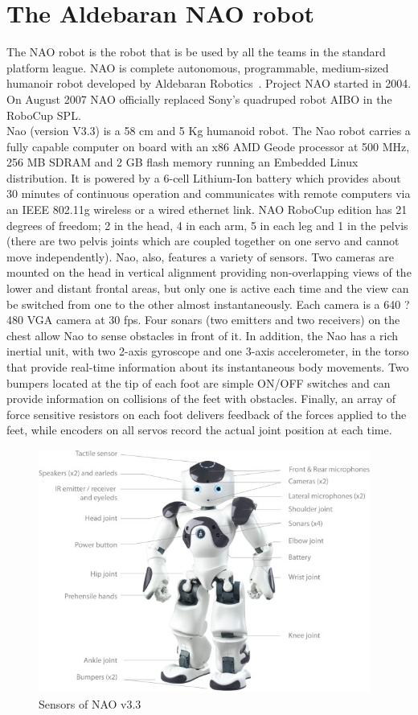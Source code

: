 \section{The Aldebaran NAO robot}
The NAO robot is the robot that is be used by all the teams in the standard platform league. NAO is complete autonomous, programmable, medium-sized humanoir robot developed by Aldebaran Robotics~\cite{naopaper}. Project NAO started in 2004. On August 2007 NAO officially replaced Sony's quadruped robot AIBO in the RoboCup SPL.\\
Nao (version V3.3) is a 58 cm and 5 Kg humanoid robot. The Nao robot carries a fully capable computer on board with an x86 AMD Geode processor at 500 MHz, 256 MB SDRAM and 2 GB flash memory running an Embedded Linux distribution. It is powered by a 6-cell Lithium-Ion battery which provides about 30 minutes of continuous operation and communicates with remote computers via an IEEE 802.11g wireless or a wired ethernet link. NAO RoboCup edition has 21 degrees of freedom; 2 in the head, 4 in each arm, 5 in each leg and 1 in the pelvis (there are two pelvis joints which are coupled together on one servo and cannot move independently). Nao, also, features a variety of sensors. Two cameras are mounted on the head in vertical alignment providing non-overlapping views of the lower and distant frontal areas, but only one is active each time and the view can be switched from one to the other almost instantaneously. Each camera is a 640 ? 480 VGA camera at 30 fps. Four sonars (two emitters and two receivers) on the chest allow Nao to sense obstacles in front of it. In addition, the Nao has a rich inertial unit, with two 2-axis gyroscope and one 3-axis accelerometer, in the torso that provide real-time information about its instantaneous body movements. Two bumpers located at the tip of each foot are simple ON/OFF switches and can provide information on collisions of the feet with obstacles. Finally, an array of force sensitive resistors on each foot delivers feedback of the forces applied to the feet, while encoders on all servos record the actual joint position at each time.
\begin{figure}[h]
	\begin{center}
		\includegraphics[height = 8cm]{Figures/nao.jpg}
 		\caption{Sensors of NAO v3.3}
 		\label{fig:sensors}
	\end{center}
\end{figure}

